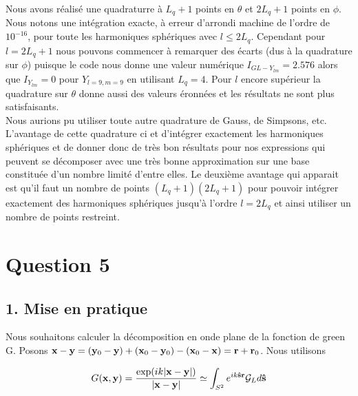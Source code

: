 \documentclass[10pt]{article}
\begin{document}
\begin{multicols}{2}
Nous avons réalisé une quadraturre à $L_q+1$ points en $\theta$ et $2L_q+1$ points en $\phi$. Nous notons une intégration exacte, à erreur d'arrondi machine de l'ordre de $10^{-16}$, pour toute les harmoniques sphériques avec $l\le 2L_q$. Cependant pour $l = 2L_q+1$ nous pouvons commencer à remarquer des écarts (dus à la quadrature sur $\phi$) puisque le code nous donne une valeur numérique $I_{GL-Y_{lm}} = 2.576$ alors que $I_{Y_{lm}} = 0$ pour $Y_{l=9,m=9}$ en utilisant $L_q = 4$. Pour $l$ encore supérieur la quadrature sur $\theta$ donne aussi des valeurs éronnées et les résultats ne sont plus satisfaisants.\\
\indent
Nous aurions pu utiliser toute autre quadrature de Gauss, de Simpsons, etc. L'avantage de cette quadrature ci et d'intégrer exactement les harmoniques sphériques et de donner donc de très bon résultats pour nos expressions qui peuvent se décomposer avec une très bonne approximation sur une base constituée d'un nombre limité d'entre elles. Le deuxième avantage qui apparait est qu'il faut un nombre de points $(L_q+1)(2L_q+1)$ pour pouvoir intégrer exactement des harmoniques sphériques jusqu'à l'ordre $l=2L_q$ et ainsi utiliser un nombre de points restreint. \\












\section*{Question 5}

\subsection*{1. Mise en pratique}

Nous souhaitons calculer la décomposition en onde plane de la fonction de green G. Posons ${\bf x} - {\bf y} = ({\bf y}_0 - {\bf y}) + ({\bf x}_0 - {\bf y}_0) - ({\bf x}_0 - {\bf x}) = {\bf r} + {\bf r}_0$. Nous utilisons

\begin{equation}
	G({\bf x}, {\bf y}) = \frac{\exp(ik|{\bf x}-{\bf y}|)}{|{\bf x}-{\bf y}|} \simeq \int_{S^{2}}{e^{ik{\bf \hat{s}}{\bf r}}\mathcal{G}_Ld{\bf \hat{s}}}
\end{equation}

\vspace*{-11pt}


\end{multicols}
\end{document}
